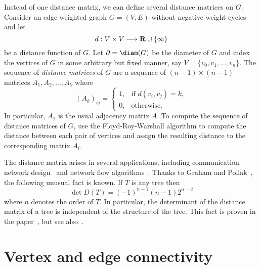 Instead of one distance matrix, we can define several distance
matrices on $G$. Consider an edge-weighted graph $G = (V,E)$ without
negative weight cycles and let
\[
d: V \times V \longrightarrow \mathbf{R} \cup \{\infty\}
\]
be a distance function of $G$. Let $\partial = \diam(G)$ be the
diameter of $G$ and index the vertices of $G$ in some arbitrary but
fixed manner, say $V = \{v_0, v_1, \dots, v_n\}$. The sequence of
\emph{distance matrices} of $G$ are a sequence
of $(n - 1) \times (n - 1)$ matrices $A_1, A_2, \dots, A_\partial$ where
\[
(A_k)_{ij}
=
\begin{cases}
1, & \text{if $d(v_i, v_j) = k$}, \\
0, & \text{otherwise}.
\end{cases}
\]
In particular, $A_1$ is the usual adjacency matrix $A$. To compute the
sequence of distance matrices of $G$, use the
Floyd-Roy-Warshall algorithm to
compute the distance between each pair of vertices and assign the
resulting distance to the corresponding matrix $A_i$.

The distance matrix arises in several applications, including
communication network design~\cite{GrahamPollak1971} and network flow
algorithms~\cite{Dijkstra1959}. Thanks to Graham
and Pollak~\cite{GrahamPollak1971}, the following
unusual fact is known. If $T$ is any tree then
\[
\det D(T)
=
(-1)^{n - 1} (n - 1) 2^{n - 2}
\]
where $n$ denotes the order of $T$. In particular, the determinant of
the distance matrix of a tree is independent of the structure of the
tree.  This fact is proven in the paper~\cite{GrahamPollak1971}, but
see also~\cite{EdelbergEtAl1976}.



\section{Vertex and edge connectivity}

